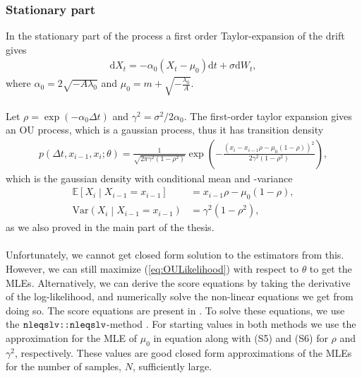 \subsubsection{Stationary part}\label{subsubsec:OUprocessStationary}
In the stationary part of the process a first order Taylor-expansion of the drift gives 
\begin{align}
    \mathrm{d}X_t = -\alpha_0\left(X_t-\mu_0\right) \mathrm{d}t + \sigma \mathrm{d}W_t,
\end{align}
where $\alpha_0 = 2\sqrt{-A\lambda_0}$ and $\mu_0 = m + \sqrt{-\frac{\lambda_0}{A}}$.\\\\
Let $\rho = \exp\left(-\alpha_0\Delta t\right)$ and $\gamma^2 = \sigma^2/2\alpha_0$. The first-order taylor expansion gives an OU process, which is a gaussian process, thus it has transition density \cite[equation (S3)]{DitlevsenSupplementary}
\begin{align}
    p\left(\Delta t, x_{i-1}, x_i;\theta\right) = \frac{1}{\sqrt{2\pi\gamma^2\left(1-\rho^2\right)}}\exp\left(-\frac{\left(x_i-x_{i-1}\rho - \mu_0\left(1-\rho\right)\right)^2}{2\gamma^2\left(1-\rho^2\right)}\right), \label{eq:OULikelihood}
\end{align}
which is the gaussian density with conditional mean and -variance
\begin{align}
    \mathbb{E}\left[X_i\middle|X_{i-1} = x_{i-1}\right] &= x_{i - 1}\rho - \mu_0\left(1-\rho\right),\\
    \mathrm{Var}\left(X_i\middle|X_{i-1} = x_{i-1}\right) &= \gamma^2\left(1-\rho^2\right),
\end{align}
as we also proved in the main part of the thesis.\\\\
Unfortunately, we cannot get closed form solution to the estimators from this. However, we can still maximize (\ref{eq:OULikelihood}) with respect to $\theta$ to get the MLEs. Alternatively, we can derive the score equations by taking the derivative of the log-likelihood, and numerically solve the non-linear equations we get from doing so. The score equations are present in \cite[p.1, bottom]{DitlevsenSupplementary}. To solve these equations, we use the $\texttt{nleqslv::nleqslv}$-method \cite{nleqslv}. For starting values in both methods we use the approximation for the MLE of $\mu_0$ in equation \cite[(S4)]{DitlevsenSupplementary} along with (S5) and (S6) for $\rho$ and $\gamma^2$, respectively. These values are good closed form approximations of the MLEs for the number of samples, $N$, sufficiently large.

